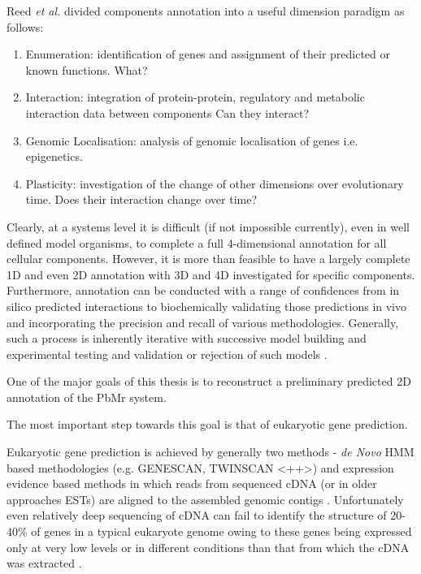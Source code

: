 Reed \textit{et al.} \citep{Reed2006} divided components annotation into a useful dimension paradigm as follows:
\begin{enumerate}
    \item Enumeration: identification of genes and assignment of their predicted or known functions. What?
    \item Interaction: integration of protein-protein, regulatory and metabolic interaction data between components Can they interact?
    \item Genomic Localisation: analysis of genomic localisation of genes i.e. epigenetics.
    \item Plasticity: investigation of the change of other dimensions over evolutionary time. Does their interaction change over time? \citep{Reed2006} 
\end{enumerate}

Clearly, at a systems level it is difficult (if not impossible currently), 
even in well defined model organisms, to complete a full 4-dimensional annotation 
for all cellular components. However, it is more than feasible to have a largely
complete 1D and even 2D annotation with 3D and 4D investigated for specific 
components.  Furthermore, annotation can be conducted with a range of confidences
from in silico predicted interactions to biochemically validating those predictions in vivo
and incorporating the precision and recall of various methodologies. Generally, such a process
is inherently iterative with successive model building and experimental testing and validation 
or rejection of such models \citep{Reed2006}.

One of the major goals of this thesis is to reconstruct a preliminary predicted
2D annotation of the PbMr system.

The most important step towards this goal is that of eukaryotic gene prediction.


Eukaryotic gene prediction is achieved by generally two methods - \textit{de Novo} HMM based
methodologies (e.g. GENESCAN, TWINSCAN \citep{}<++>) and expression evidence based methods
in which reads from sequenced cDNA (or in older approaches ESTs) are aligned to the 
assembled genomic contigs \citep{Brent2007}.  Unfortunately even relatively deep
sequencing of cDNA can fail to identify the structure of 20-40\% of genes in a typical
eukaryote genome owing to these genes being expressed only at very low levels or in
different conditions than that from which the cDNA was extracted \citep{Brent2007}.






